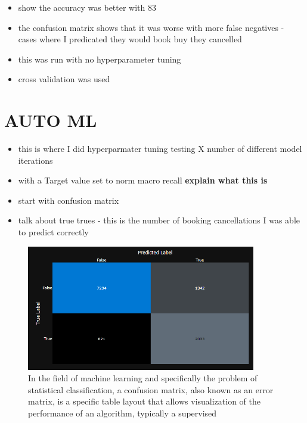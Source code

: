 \begin{itemize}
\item show the accuracy was better with 83
\item the confusion matrix shows that it was worse with more false negatives - cases where I predicated they would book buy they cancelled
\item this was run with no hyperparameter tuning
\item cross validation was used
\end{itemize}



\section{AUTO ML}

\begin{itemize}
\item this is where I did hyperparmater tuning testing X number of different model iterations 
\item with a Target value set to norm macro recall \textbf{explain what this is}
\end{itemize}



\begin{itemize}
\item start with confusion matrix
\item talk about true trues - this is the number of booking cancellations I was able to predict correctly 
\end{itemize}

\begin{figure}[hbt!]
 \includegraphics[width=10cm]{figures/azure_ml_confusion_matrix.png}
 \caption{In the field of machine learning and specifically the problem of statistical classification, a confusion matrix, also known as an error matrix, is a specific table layout that allows visualization of the performance of an algorithm, typically a supervised}
\end{figure}

